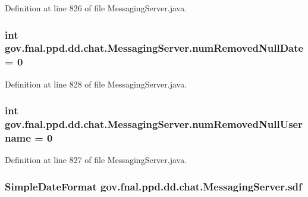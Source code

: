 Definition at line 826 of file Messaging\-Server.\-java.

\hypertarget{classgov_1_1fnal_1_1ppd_1_1dd_1_1chat_1_1MessagingServer_ab986fa29bcdc51bd186ad23e1c699426}{
\subsubsection[{num\-Removed\-Null\-Date}]{\setlength{\rightskip}{0pt plus 5cm}int gov.\-fnal.\-ppd.\-dd.\-chat.\-Messaging\-Server.\-num\-Removed\-Null\-Date = 0}}\label{classgov_1_1fnal_1_1ppd_1_1dd_1_1chat_1_1MessagingServer_ab986fa29bcdc51bd186ad23e1c699426}


Definition at line 828 of file Messaging\-Server.\-java.

\hypertarget{classgov_1_1fnal_1_1ppd_1_1dd_1_1chat_1_1MessagingServer_a84d7bc143f1eee20c7e39ce9024783c9}{
\subsubsection[{num\-Removed\-Null\-Username}]{\setlength{\rightskip}{0pt plus 5cm}int gov.\-fnal.\-ppd.\-dd.\-chat.\-Messaging\-Server.\-num\-Removed\-Null\-Username = 0}}\label{classgov_1_1fnal_1_1ppd_1_1dd_1_1chat_1_1MessagingServer_a84d7bc143f1eee20c7e39ce9024783c9}


Definition at line 827 of file Messaging\-Server.\-java.

\hypertarget{classgov_1_1fnal_1_1ppd_1_1dd_1_1chat_1_1MessagingServer_ac727c375b30722fb0d0a88f27eb97954}{
\subsubsection[{sdf}]{\setlength{\rightskip}{0pt plus 5cm}Simple\-Date\-Format gov.\-fnal.\-ppd.\-dd.\-chat.\-Messaging\-Server.\-sdf\hspace{0.3cm}{\ttfamily [protected]}}}\label{classgov_1_1fnal_1_1ppd_1_1dd_1_1chat_1_1MessagingServer_ac727c375b30722fb0d0a88f27eb97954}


